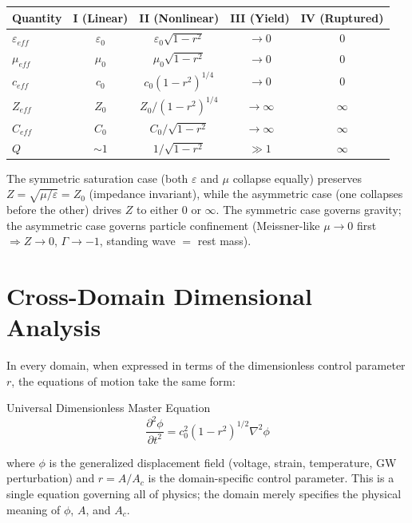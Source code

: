 \begin{center}
\begin{tabular}{|l|c|c|c|c|}
\hline
\textbf{Quantity} & \textbf{I (Linear)} & \textbf{II (Nonlinear)} & \textbf{III (Yield)} & \textbf{IV (Ruptured)} \\ \hline
$\varepsilon_{eff}$ & $\varepsilon_0$ & $\varepsilon_0 \sqrt{1-r^2}$ & $\to 0$ & 0 \\
$\mu_{eff}$         & $\mu_0$         & $\mu_0 \sqrt{1-r^2}$         & $\to 0$ & 0 \\
$c_{eff}$           & $c_0$           & $c_0(1-r^2)^{1/4}$          & $\to 0$ & 0 \\
$Z_{eff}$           & $Z_0$           & $Z_0 / (1-r^2)^{1/4}$       & $\to \infty$ & $\infty$ \\
$C_{eff}$           & $C_0$           & $C_0 / \sqrt{1-r^2}$        & $\to \infty$ & $\infty$ \\
$Q$                 & $\sim 1$        & $1/\sqrt{1-r^2}$             & $\gg 1$      & $\infty$ \\ \hline
\end{tabular}
\end{center}

\noindent The symmetric saturation case (both $\varepsilon$ and $\mu$ collapse equally) preserves $Z = \sqrt{\mu/\varepsilon} = Z_0$ (impedance invariant), while the asymmetric case (one collapses before the other) drives $Z$ to either 0 or $\infty$. The symmetric case governs gravity; the asymmetric case governs particle confinement (Meissner-like $\mu \to 0$ first $\Rightarrow Z \to 0$, $\Gamma \to -1$, standing wave $=$ rest mass).

\section{Cross-Domain Dimensional Analysis}
\label{sec:dimensional_analysis}

In every domain, when expressed in terms of the dimensionless control parameter $r$, the equations of motion take the same form:
\begin{resultbox}{Universal Dimensionless Master Equation}
\begin{equation}
    \frac{\partial^2 \phi}{\partial t^2} = c_0^2 (1-r^2)^{1/2} \nabla^2 \phi
\end{equation}
\end{resultbox}
where $\phi$ is the generalized displacement field (voltage, strain, temperature, GW perturbation) and $r = A/A_c$ is the domain-specific control parameter. This is a single equation governing all of physics; the domain merely specifies the physical meaning of $\phi$, $A$, and $A_c$.

